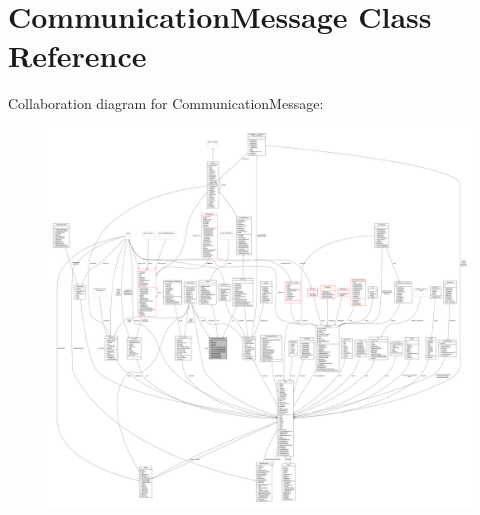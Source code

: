 \hypertarget{classCommunicationMessage}{}\section{Communication\+Message Class Reference}
\label{classCommunicationMessage}


Collaboration diagram for Communication\+Message\+:
\nopagebreak
\begin{figure}[H]
\begin{center}
\leavevmode
\includegraphics[width=350pt]{d8/d1e/classCommunicationMessage__coll__graph}
\end{center}
\end{figure}
